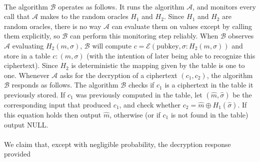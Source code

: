 \documentclass[letterpaper,12pt,oneside,onecolumn]{report}
\begin{document}
\paragraph{}
The algorithm $\mathcal{B}$ operates as follows. It runs the algorithm $\mathcal{A}$, and monitors every call that $\mathcal{A}$ makes to the random oracles $H_1$ and $H_2$. Since $H_1$ and $H_2$ are random oracles, there is no way $\mathcal{A}$ can evaluate them on values except by calling them explicitly, so $\mathcal{B}$ can perform this monitoring step reliably. When $\mathcal{B}$ observes $\mathcal{A}$ evaluating $H_2(m,\sigma)$, $\mathcal{B}$ will compute $c = \mathcal{E}(\text{pubkey}, \sigma:H_2(m,\sigma))$ and store in a table $c : (m,\sigma)$ (with the intention of later being able to recognize this ciphertext). Since $H_2$ is deterministic the mapping given by the table is one to one. Whenever $\mathcal{A}$ asks for the decryption of a ciphertext $(c_1,c_2)$, the algorithm $\mathcal{B}$ responds as follows. The algorithm $\mathcal{B}$ checks if $c_1$ is a ciphertext in the table it previously stored. If $c_1$ was previously computed in the table, let $(\hat{m}, \hat{\sigma})$ be the corresponding input that produced $c_1$, and check whether $c_2 = \hat{m} \oplus H_1(\hat{\sigma})$. If this equation holds then output $\hat{m}$, otherwise (or if $c_1$ is not found in the table) output NULL. 
\paragraph{}
We claim that, except with negligible probability, the decryption response provided
\end{document}

